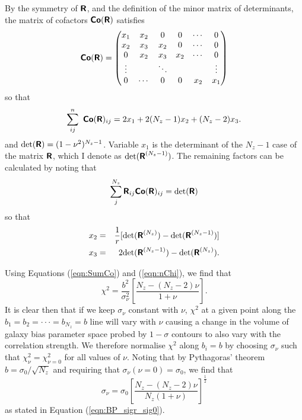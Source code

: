 \documentclass[useAMS,usenatbib,times,letter,amssymb]{mn2e}
\def\be{\begin{equation}}
\def\ee{\end{equation}}
\begin{document}
By the symmetry of $\textbf{\textsf{R}}$, and the definition of the minor matrix of determinants, the matrix of cofactors  $\textbf{\textsf{Co}}(\textbf{\textsf{R}})$ satisfies %
\be
\mathbfss{Co}(\mathbfss{R}) = \begin{pmatrix} x_1 & x_2 & 0 & 0 & \cdots & 0 \\  x_2 & x_3 & x_2 & 0 & \cdots & 0 \\ 0 & x_2 & x_3 & x_2 & \cdots & 0 \\ \vdots &  & \ddots &  &  & \vdots \\  0 & \cdots & 0 & 0 & x_2 & x_1 \end{pmatrix}
\ee
so that
 \be\label{eqn:SumCo}
 \sum_{ij}^n \mathbfss{ Co}(\mathbfss{R})_{ij} = 2x_1 + 2(N_z-1)x_2 + (N_z-2)x_3.
 \ee
 and ${\rm det}(\textbf{\textsf{R}}) = (1-\nu^2)^{N_z-1}$.  Variable $x_1$ is the determinant of the $N_z-1$ case of the matrix $\textbf{\textsf{R}}$, which I denote as ${\rm det}(\textbf{\textsf{R}}^{(N_z-1)})$. The remaining factors can be calculated by noting that
 \be
 \sum_{j}^{N_z} \mathbfss{R}_{ij} \mathbfss{Co}(\mathbfss{R})_{ij} = {\rm det}(\mathbfss{R})
 \ee
 so that 
 \begin{eqnarray}
x_2 &=& \frac{1}{r}[{\rm det}(\textbf{\textsf{R}}^{(N_z)}) - {\rm det}(\textbf{\textsf{R}}^{(N_z-1)})] \\
x_3 &=& 2{\rm det}(\textbf{\textsf{R}}^{(N_z-1)}) - {\rm det}(\textbf{\textsf{R}}^{(N_z)}).
\end{eqnarray}

Using Equations (\ref{eqn:SumCo}) and (\ref{eqn:nChi}), we find that 
\be
 \chi^2 = \frac{b^2}{\sigma_\nu^2}\left[\frac{N_z-(N_z-2)\nu}{1+\nu}\right].
 \ee
It is clear then that if we keep $\sigma_\nu$ constant with $\nu$, $\chi^2$ at a given point along the $b_1 = b_2 = \cdot\cdot\cdot = b_{N_z} = b$ line will vary with $\nu$ causing a change in the volume of galaxy bias parameter space probed by $1-\sigma$ contours to also vary with the correlation strength. We therefore normalise $\chi^2$ along $b_i = b$ by choosing $\sigma_\nu$ such that $\chi^2_\nu = \chi^2_{\nu=0}$ for all values of $\nu$. Noting that by Pythagoras' theorem $b = \sigma_0/\sqrt{N_z}$ and requiring that $\sigma_\nu(\nu=0) = \sigma_0$, we find that
 \be
 \sigma_\nu = \sigma_0\left[\frac{N_z-(N_z-2)\nu}{N_z(1+\nu)}\right]^{\frac{1}{2}}
 \ee
  as stated in Equation (\ref{eqn:BP_sigr_sig0}).

\bsp

\label{lastpage}
\end{document}
